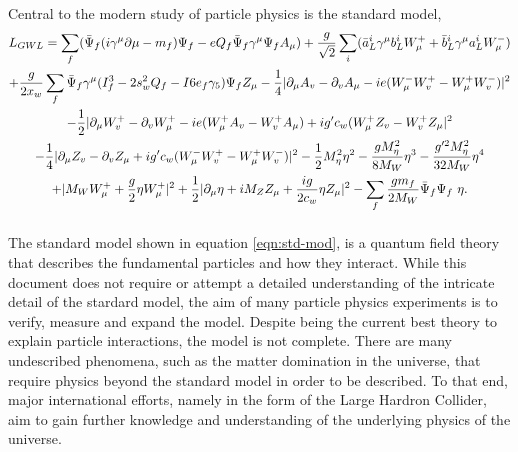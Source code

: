     Central to the modern study of particle physics is the standard model,
    \begin{multline} \label{eqn:std-mod}
      L_{GWL} = \sum_{f} ( \bar{\Psi}_{f} ( i \gamma^\mu \partial \mu - m_{f} ) \Psi_{f} - eQ_{f} \bar{\Psi}_{f} \gamma^\mu \Psi_{f} A_{\mu} ) + \frac{g}{\sqrt{2}} \sum_{i} ( \bar{a}^i_L \gamma^\mu b^i_L W^+_\mu + \bar{b}^i_L \gamma^\mu a^i_L W^-_\mu )                        \\                           
              + \frac{g}{2x_w} \sum_f \bar{\Psi}_f \gamma^\mu ( I^3_f - 2s^2_w Q_f - I6e_f \gamma_5 ) \Psi_f Z_\mu - \frac{1}{4} | \partial_\mu A_v - \partial_v A_\mu - ie(W^-_\mu W^+_v - W^+_\mu W^-_v ) |^2                                         \\                                     
              - \frac{1}{2} | \partial_\mu W^+_v - \partial_v W^+_\mu - ie ( W^+_\mu A_v - W^+_v A_\mu ) + ig' c_w (W^+_\mu Z_v - W^+_v Z_\mu |^2 \\
              - \frac{1}{4} | \partial_\mu Z_v - \partial_v Z_\mu + ig' c_w (W^-_\mu W^+_v - W^+_\mu W^-_v ) |^2 - \frac{1}{2} M^2_\eta \eta^2  - \frac{gM^2_\eta}{8M_W} \eta^3  - \frac{g'^2 M^2_\eta}{32M_W}\eta^4    \\     
              + | M_W W^+_\mu + \frac{g}{2} \eta W^+_\mu |^2 + \frac{1}{2} | \partial_\mu \eta + i M_Z Z_\mu + \frac{ig}{2c_w} \eta Z_\mu |^2 - \sum_f \frac{g m_f}{2 M_W} \bar{\Psi}_f \Psi_f\ \eta. 
              \vspace{1em}                                                                               
    \end{multline}
    The standard model shown in equation \ref{eqn:std-mod}, is a quantum field theory that describes the fundamental particles and how they interact.
    While this document does not require or attempt a detailed understanding of the intricate detail of the stardard model,
    the aim of many particle physics experiments is to verify, measure and expand the model.
    Despite being the current best theory to explain particle interactions, the model is not complete.
    There are many undescribed phenomena, such as the matter domination in the universe, that require physics beyond the standard model in order to be described.
    To that end, major international efforts, namely in the form of the Large Hardron Collider, aim to gain further knowledge and understanding of the underlying physics of the universe. \cite{ref:std}

